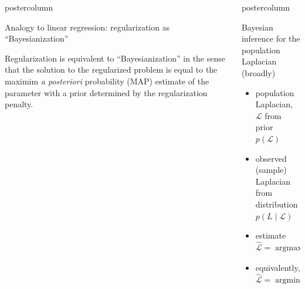 \documentclass[final,hyperref={pdfpagelabels=false}]{beamer}
\DeclareMathOperator*{\argmax}{argmax}
\DeclareMathOperator*{\argmin}{argmin}
\newlength{\columnheight}
\begin{document}
\begin{frame}
\begin{columns}
\begin{column}{.49\textwidth}
\begin{beamercolorbox}[center,wd=\textwidth]{postercolumn}
\begin{minipage}[T]{.95\textwidth}
{\begin{block}{Analogy to linear regression: regularization as ``Bayesianization''}
\begin{center}
  \end{center}

  \vspace{2em}
  Regularization is equivalent to ``Bayesianization'' in the sense that
  the solution to the regularized problem is equal to the maximim \textit{a posteriori} probability
  (MAP) estimate of the parameter with a prior determined by the
  regularization penalty.

	    
            \end{block}
          }
        \end{minipage}
      \end{beamercolorbox}
    \end{column}

    \begin{column}{.49\textwidth}
      \begin{beamercolorbox}[center,wd=\textwidth]{postercolumn}
        \begin{minipage}[T]{.95\textwidth} %
          \parbox[t][\columnheight]{\textwidth}{ %
            
            \begin{block}{Bayesian inference for the population Laplacian (broadly)}
  \begin{itemize}
    \item population Laplacian, $\mathcal{L}$ from prior $p(\mathcal{L})$
    \item observed (sample) Laplacian from distribution $p(L \mid \mathcal{L})$
    \item estimate $\mathcal{\hat L} = \argmax_{\mathcal{L}} \{ p(\mathcal{L} \mid L) \}$
    \item equivalently,
      $\mathcal{\hat L} = \argmin_{\mathcal{L}} \{ -\log p(L \mid \mathcal{L}) -\log p(\mathcal{L}) \}$
  \end{itemize}


\end{block}}
\end{minipage}
\end{beamercolorbox}
\end{column}
\end{columns}
\end{frame}
\end{document}
